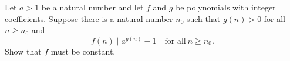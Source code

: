 Let $a > 1$ be a natural number and let $f$ and $g$ be polynomials with integer coefficients.
Suppose there is a natural number $n_0$ such that $g(n) >0$ for all $n \geq n_0$ and 
$$f(n)\mid a^{g(n)} - 1 \quad \text{for all} \ n \geq n_0.$$
Show that $f$ must be constant.